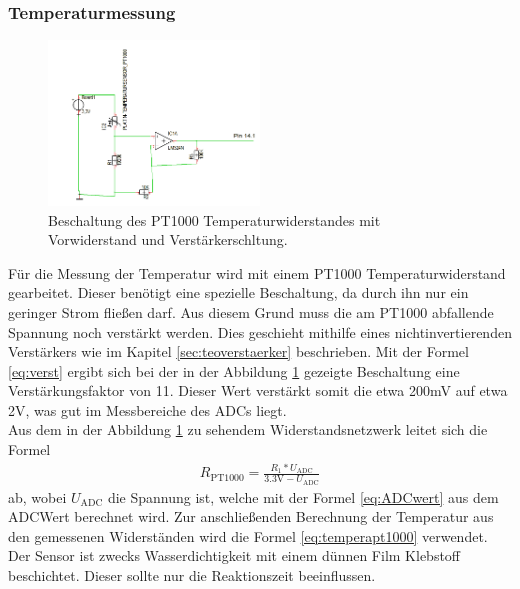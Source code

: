 \documentclass[12pt,a4paper,titlepage,headinclude,bibtotoc]{scrartcl}
\begin{document}
\subsubsection{Temperaturmessung}
\begin{figure}[!h]
\centering
\includegraphics[width=0.5\textwidth]{Fotos/PT1000Schaltung.png}
\caption{Beschaltung des PT1000 Temperaturwiderstandes mit Vorwiderstand und Verstärkerschltung.}
\label{fig:PT1000Schaltung}
\end{figure}
Für die Messung der Temperatur wird mit einem PT1000 Temperaturwiderstand gearbeitet.
Dieser benötigt eine spezielle Beschaltung, da durch ihn nur ein geringer Strom fließen darf.
Aus diesem Grund muss die am PT1000 abfallende Spannung noch verstärkt werden.
Dies geschieht mithilfe eines nichtinvertierenden Verstärkers wie im Kapitel \ref{sec:teoverstaerker} beschrieben.
Mit der Formel \eqref{eq:verst} ergibt sich bei der in der Abbildung \ref{fig:PT1000Schaltung} gezeigte Beschaltung eine Verstärkungsfaktor von 11.
Dieser Wert verstärkt somit die etwa 200\si{\milli\volt} auf etwa 2\si{\volt}, was gut im Messbereiche des ADCs liegt.\\
Aus dem in der Abbildung \ref{fig:PT1000Schaltung} zu sehendem Widerstandsnetzwerk leitet sich die Formel
\begin{align}
	R_\text{PT1000}=\frac{R_1*U_\text{ADC}}{3.3\si{\volt}-U_\text{ADC}}
\end{align}
ab, wobei $U_\text{ADC}$ die Spannung ist, welche mit der Formel \eqref{eq:ADCwert} aus dem ADCWert berechnet wird.
Zur anschließenden Berechnung der Temperatur aus den gemessenen Widerständen wird die Formel \eqref{eq:temperapt1000} verwendet.\\
Der Sensor ist zwecks Wasserdichtigkeit mit einem dünnen Film Klebstoff beschichtet.
Dieser sollte nur die Reaktionszeit beeinflussen.
\end{document}
